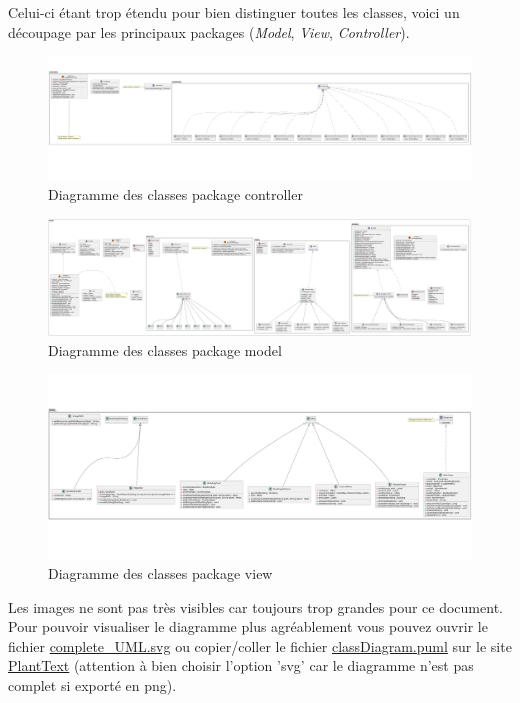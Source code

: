 \documentclass{article}
\begin{document}
Celui-ci étant trop étendu pour bien distinguer toutes les classes, voici un découpage par les principaux packages (\textit{Model}, \textit{View}, \textit{Controller}).

\begin{figure}[h]
    \caption{Diagramme des classes package controller}
    \centering
    \includegraphics[width=\textwidth,height=\textheight,keepaspectratio]{controller_UML}
\end{figure}
\pagebreak
\begin{figure}[h]
    \caption{Diagramme des classes package model}
    \centering
    \includegraphics[width=\textwidth,height=\textheight,keepaspectratio]{model_UML}
\end{figure}

\begin{figure}[h]
    \caption{Diagramme des classes package view}
    \centering
    \includegraphics[width=\textwidth,height=\textheight,keepaspectratio]{view_UML}
\end{figure}
\pagebreak
Les images ne sont pas très visibles car toujours trop grandes pour ce document. Pour pouvoir visualiser
le diagramme plus agréablement vous pouvez ouvrir le fichier \href{run:./complete_UML.svg}{complete\_UML.svg}
ou copier/coller le fichier \href{run:./classDiagram.puml}{classDiagram.puml} sur le site \href{https://www.planttext.com/}{PlantText}
(attention à bien choisir l'option 'svg' car le diagramme n'est pas complet si exporté en png).
\end{document}
